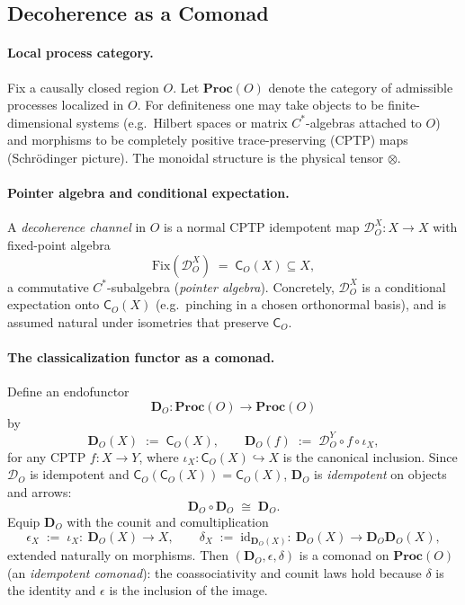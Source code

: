\documentclass[11pt]{article}
\theoremstyle{upright}
\begin{document}
\subsection{Decoherence as a Comonad}
\label{sec:decoherence-comonad}

\paragraph{Local process category.}
Fix a causally closed region $O$. Let $\mathbf{Proc}(O)$ denote the category of admissible processes localized in $O$. For definiteness one may take objects to be finite-dimensional systems (e.g.\ Hilbert spaces or matrix $C^\ast$-algebras attached to $O$) and morphisms to be completely positive trace-preserving (CPTP) maps (Schr\"odinger picture). The monoidal structure is the physical tensor $\otimes$.

\paragraph{Pointer algebra and conditional expectation.}
A \emph{decoherence channel} in $O$ is a normal CPTP idempotent map $\mathcal{D}_O^X:X\to X$ with fixed-point algebra
\[
\mathrm{Fix}(\mathcal{D}_O^X)\;=\;\mathsf{C}_O(X)\subseteq X,
\]
a commutative $C^\ast$-subalgebra (\emph{pointer algebra}). Concretely, $\mathcal{D}_O^X$ is a conditional expectation onto $\mathsf{C}_O(X)$ (e.g.\ pinching in a chosen orthonormal basis), and is assumed natural under isometries that preserve $\mathsf{C}_O$.

\paragraph{The classicalization functor as a comonad.}
Define an endofunctor
\[
\mathbf{D}_O:\mathbf{Proc}(O)\longrightarrow \mathbf{Proc}(O)
\]
by
\[
\mathbf{D}_O(X)\;:=\;\mathsf{C}_O(X),\qquad
\mathbf{D}_O(f)\;:=\;\mathcal{D}_O^Y\circ f\circ \iota_X,
\]
for any CPTP $f:X\to Y$, where $\iota_X:\mathsf{C}_O(X)\hookrightarrow X$ is the canonical inclusion. Since $\mathcal{D}_O$ is idempotent and $\mathsf{C}_O(\mathsf{C}_O(X))=\mathsf{C}_O(X)$, $\mathbf{D}_O$ is \emph{idempotent} on objects and arrows:
\[
\mathbf{D}_O\circ \mathbf{D}_O \;\cong\; \mathbf{D}_O.
\]
Equip $\mathbf{D}_O$ with the counit and comultiplication
\[
\epsilon_X \;:=\; \iota_X:\ \mathbf{D}_O(X)\to X,
\qquad
\delta_X \;:=\; \mathrm{id}_{\mathbf{D}_O(X)}:\ \mathbf{D}_O(X)\to \mathbf{D}_O\mathbf{D}_O(X),
\]
extended naturally on morphisms. Then $(\mathbf{D}_O,\epsilon,\delta)$ is a comonad on $\mathbf{Proc}(O)$ (an \emph{idempotent comonad}): the coassociativity and counit laws hold because $\delta$ is the identity and $\epsilon$ is the inclusion of the image.
\end{document}
